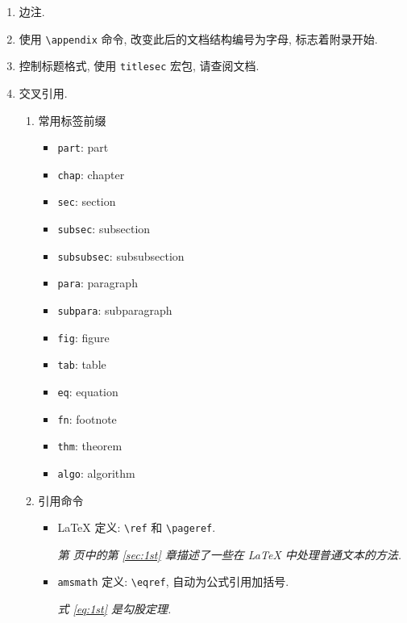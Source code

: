 \documentclass[UTF8,no-math]{ctexart}
\numberwithin{enumi}{section}
\begin{document}
\begin{enumerate}
\begin{enumerate}
{            }
            \setcounter{footnote}{\value{tmp}}
        \end{enumerate}
        \item 边注.  
        \item 使用 \verb|\appendix| 命令, 改变此后的文档结构编号为字母, 标志着附录开始. 
        \item 控制标题格式, 使用 \texttt{titlesec} 宏包, 请查阅文档. 
        \item 交叉引用.
        \begin{enumerate}
            \item 常用标签前缀
            \begin{multicols}{2}
                \begin{itemize}
                    \item \verb|part|: part
                    \item \verb|chap|: chapter
                    \item \verb|sec|: section
                    \item \verb|subsec|: subsection
                    \item \verb|subsubsec|: subsubsection
                    \item \verb|para|: paragraph
                    \item \verb|subpara|: subparagraph
                    \item \verb|fig|: figure
                    \item \verb|tab|: table
                    \item \verb|eq|: equation
                    \item \verb|fn|: footnote
                    \item \verb|thm|: theorem
                    \item \verb|algo|: algorithm
                \end{itemize}
            \end{multicols}
            \item 引用命令
            \begin{itemize}
                \item {\LaTeX} 定义: \verb|\ref| 和 \verb|\pageref|. \par
                \emph{第 \pageref{sec:1st} 页中的第 \ref{sec:1st} 章描述了一些在 {\LaTeX} 中处理普通文本的方法. }
                \item \texttt{amsmath} 定义: \verb|\eqref|, 自动为公式引用加括号. \par \emph{ 式 \eqref{eq:1st} 是勾股定理. }

\end{itemize}
\end{enumerate}
\end{enumerate}
\end{document}
